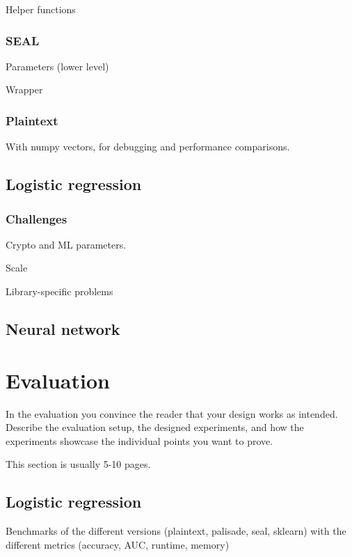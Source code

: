 \documentclass[a4paper,11pt,oneside]{report}
\begin{document}
Helper functions

\subsection{SEAL}

Parameters (lower level)

Wrapper

\subsection{Plaintext}

With numpy vectors, for debugging and performance comparisons.

\section{Logistic regression}

\subsection{Challenges}
Crypto and ML parameters.

Scale

Library-specific problems

\section{Neural network}



\chapter{Evaluation}

In the evaluation you convince the reader that your design works as intended.
Describe the evaluation setup, the designed experiments, and how the
experiments showcase the individual points you want to prove.

This section is usually 5-10 pages.

\section{Logistic regression}

Benchmarks of the different versions (plaintext, palisade, seal, sklearn) with the different metrics (accuracy, AUC, runtime, memory)
\end{document}
